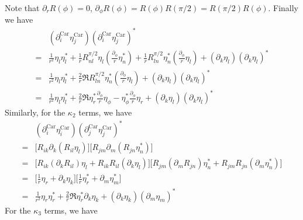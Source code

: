 \documentclass[aps,prl,preprint]{revtex4-2}
\begin{document}
Note that $\partial_r R(\phi)=0$, $\partial_\phi R(\phi)=R(\phi)R(\pi/2)=R(\pi/2)R(\phi)$.
Finally we have
\begin{align}
    &(\partial_i^{\text{Car}}\eta_j^{\text{Car}})(\partial_i^{\text{Car}}\eta_j^{\text{Car}})^*\\
    =&\frac{1}{r^2}\eta_l\eta_l^*
    +\frac{1}{r}R^{\pi/2}_{nl}\eta_l\left(\frac{\partial_\phi}{r}\eta_n^*\right)
    +\frac{1}{r}R^{\pi/2}_{ln}\eta_n^*\left(\frac{\partial_\phi}{r}\eta_l\right)
    + (\partial_k\eta_l)(\partial_k \eta_l)^*\\
    =&\frac{1}{r^2}\eta_l\eta_l^*
    +\frac{2}{r}\Re{R^{\pi/2}_{ln}\eta_n^*\left(\frac{\partial_\phi}{r}\eta_l\right)}
    +(\partial_k\eta_l)(\partial_k \eta_l)^*\\
    =&\frac{1}{r^2}\eta_l\eta_l^*
    +\frac{2}{r}\Re{\eta_r^*\frac{\partial_\phi}{r}\eta_\phi - \eta_\phi^*\frac{\partial_\phi}{r}\eta_r}
    +(\partial_k\eta_l)(\partial_k \eta_l)^*
\end{align}
Similarly, for the $\kappa_2$ terms, we have
\begin{align}
    &(\partial_i^{\text{Car}}\eta_i^{\text{Car}})(\partial_j^{\text{Car}}\eta_j^{\text{Car}})^*\\
    =&\bigg[R_{ik}\partial_k(R_{il}\eta_l)\bigg]\bigg[R_{jm}\partial_m(R_{jn}\eta_n^*)\bigg]\\
    =&\bigg[R_{ik}(\partial_k R_{il})\eta_l + R_{ik}R_{il}(\partial_k\eta_l)\bigg]
    \bigg[R_{jm}(\partial_m R_{jn})\eta_n^* + R_{jm}R_{jn}(\partial_m\eta_n^*)\bigg]\\
    =&\bigg[\frac{1}{r}\eta_r + \partial_k\eta_k\bigg]\bigg[\frac{1}{r}\eta_r^* + \partial_m\eta_m^*\bigg]\\
    =&\frac{1}{r^2}\eta_r\eta_r^* + \frac{2}{r}\Re{\eta_r^*\partial_k\eta_k}
    +(\partial_k\eta_k)(\partial_m \eta_m)^*
\end{align}
For the $\kappa_3$ terms, we have
\end{document}
